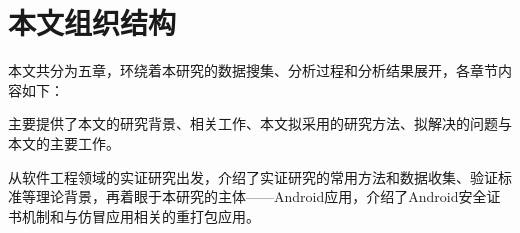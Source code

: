 %
%
%
%
%
%
\section{本文组织结构}
本文共分为五章，环绕着本研究的数据搜集、分析过程和分析结果展开，各章节内容如下：

 主要提供了本文的研究背景、相关工作、本文拟采用的研究方法、拟解决的问题与本文的主要工作。

 从软件工程领域的实证研究出发，介绍了实证研究的常用方法和数据收集、验证标准等理论背景，再着眼于本研究的主体——Android应用，介绍了Android安全证书机制和与仿冒应用相关的重打包应用。

